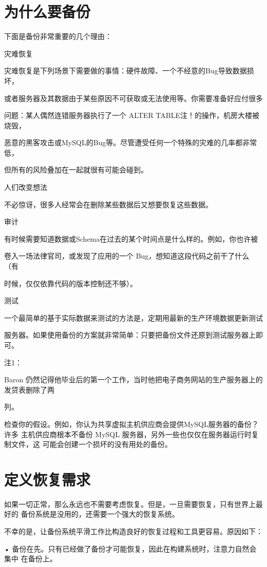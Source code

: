 \section{为什么要备份}
下面是备份非常重要的几个理由：

灾难恢复

灾难恢复是下列场景下需要做的事情：硬件故障、一个不经意的Bug导致数据损坏，

或者服务器及其数据由于某些原因不可获取或无法使用等。你需要准备好应付很多

问题：某人偶然连错服务器执行了一个 ALTER TABLE注！的操作，机房大楼被烧毁，

恶意的黑客攻击或MySQL的Bug等。尽管遭受任何一个特殊的灾难的几率都非常低，

但所有的风险叠加在一起就很有可能会碰到。

人们改变想法

不必惊讶，很多人经常会在删除某些数据后又想要恢复这些数据。

审计

有时候需要知道数据或Schema在过去的某个时间点是什么样的。例如，你也许被

卷入一场法律官司，或发现了应用的一个 Bug，想知道这段代码之前干了什么（有

时候，仅仅依靠代码的版本控制还不够）。

测试

一个最简单的基于实际数据来测试的方法是，定期用最新的生产环境数据更新测试

服务器。如果使用备份的方案就非常简单：只要把备份文件还原到测试服务器上即可。

注1：

Baron 仍然记得他毕业后的第一个工作，当时他把电子商务网站的生产服务器上的发贷表删除了两

列。

检查你的假设。例如，你认为共享虚拟主机供应商会提供MySQL服务器的备份？许多
主机供应商根本不备份 MySQL 服务器，另外一些也仅仅在服务器运行时复制文件，这
可能会创建一个损坏的没有用处的备份。

\section{定义恢复需求}
如果一切正常，那么永远也不需要考虑恢复。但是，一旦需要恢复，只有世界上最好的
备份系统是没用的，还需要一个强大的恢复系统。

不幸的是，让备份系统平滑工作比构造良好的恢复过程和工具更容易。原因如下：

• 备份在先。只有已经做了备份才可能恢复，因此在构建系统时，注意力自然会集中
在备份上。

